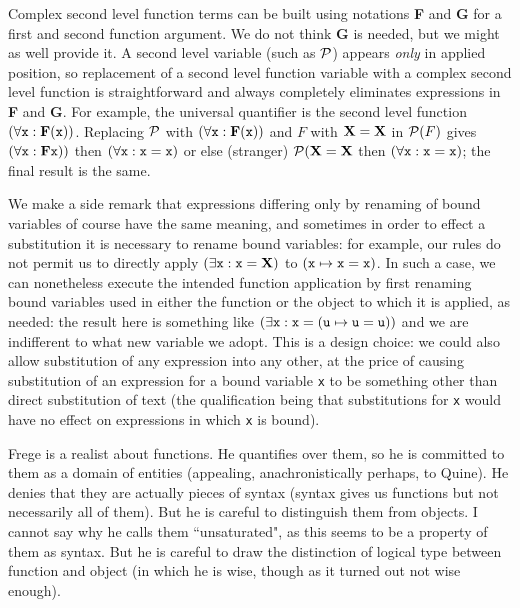 \documentclass[12pt]{article}
\begin{document}
Complex second level function terms can be built using notations {\bf F} and {\bf G} for a first and second function argument.  We do not think {\bf G} is needed, but we might as well provide it.  A second level variable (such as $\cal P$)  appears {\em only\/} in applied position, so replacement of a second level function variable with a complex second level function is straightforward and always completely eliminates expressions in {\bf F} and {\bf G}.  For example, the universal quantifier is the second level function $(\forall {\tt x}:{\bf F}({\tt x}))$.  Replacing $\cal P$ with $(\forall {\tt x}:{\bf F}({\tt x}))$ and $F$ with ${\bf X}={\bf X}$ in ${\cal P}(F)$ gives
$(\forall {\tt x}:{\bf F}{\tt x}))$ then $(\forall {\tt x}:{\tt x}={\tt x})$ or else (stranger)  ${\cal P}({\bf X} = {\bf X}$ then $(\forall {\tt x}:{\tt x}={\tt x})$;  the final result is the same.

We make a side remark that expressions differing only by renaming of bound variables of course have the same meaning, and sometimes in order to effect a substitution it is necessary to rename bound variables:
for example, our rules do not permit us to directly apply $(\exists {\tt x}:{\tt x} = {\bf X})$ to $({\tt x} \mapsto {\tt x} = {\tt x})$.  In such a case, we can nonetheless execute the intended function application by
first renaming bound variables used in either the function or the object to which it is applied, as needed:  the result here is something like  $(\exists {\tt x}:{\tt x} =({\tt u} \mapsto {\tt u} = {\tt u}))$ and we are indifferent to what new variable we adopt.  This is a design choice: we could also allow substitution of any expression into any other, at the price of causing substitution of an expression for a bound variable {\tt x} to be something other than direct substitution of text (the qualification being that substitutions for {\tt x} would have no effect on expressions in which {\tt x} is bound).

Frege is a realist about functions.  He quantifies over them, so he is committed to them as a domain of entities  (appealing, anachronistically perhaps, to Quine).  He denies that they are actually pieces of syntax (syntax gives us functions but not necessarily all of them).  But he is careful to distinguish them from objects.  I cannot say why he calls them ``unsaturated", as this seems to be a property of them as syntax.  But he is careful to draw the distinction of logical type between function and object (in which he is wise, though as it turned out not wise enough).
\end{document}
